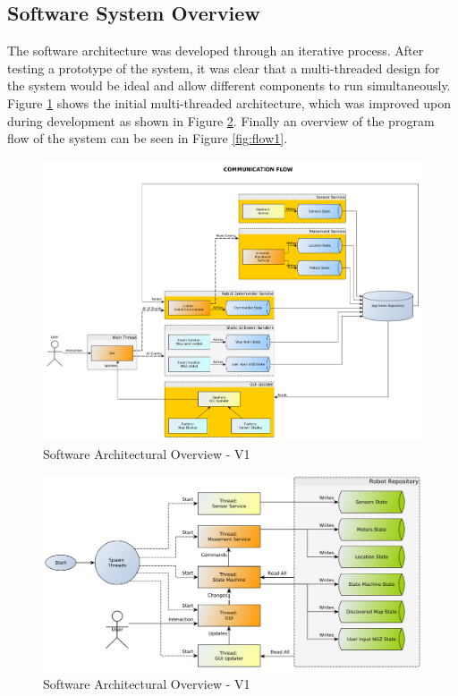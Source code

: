 \subsection{Software System Overview}
The software architecture was developed through an iterative process. After testing a prototype of the system, it was clear that a multi-threaded design for the system would be ideal and allow different components to run simultaneously. Figure \ref{fig:threaded1} shows the initial multi-threaded architecture, which was improved upon during development as shown in Figure \ref{fig:threaded2}. Finally an overview of the program flow of the system can be seen in Figure \ref{fig:flow1}.

\begin{figure}[H]
	\centering
	\includegraphics[width=\textwidth]{DiagramThreaded1.png}
	\caption{\label{fig:threaded1} Software Architectural Overview - V1}
\end{figure}

\begin{figure}[H]
	\centering
	\includegraphics[width=\textwidth]{DiagramThreaded2.png}
	\caption{\label{fig:threaded2} Software Architectural Overview - V1}
\end{figure}

